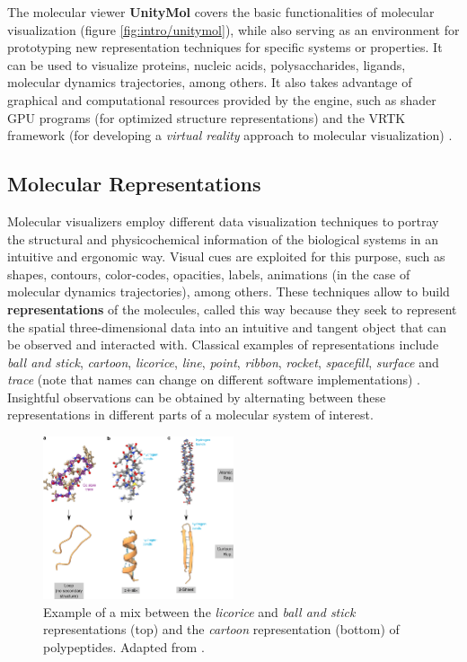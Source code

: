     The molecular viewer \textbf{UnityMol} covers the basic functionalities of molecular visualization (figure \ref{fig:intro/unitymol}), while also serving as an environment for prototyping new representation techniques for specific systems or properties. It can be used to visualize proteins, nucleic acids, polysaccharides, ligands, molecular dynamics trajectories, among others. It also takes advantage of graphical and computational resources provided by the engine, such as shader GPU programs (for optimized structure representations) and the VRTK framework (for developing a \textit{virtual reality} approach to molecular visualization) \cite{unitymol_2015, unitymol_web}.

  \subsection{Molecular Representations}
    Molecular visualizers employ different data visualization techniques to portray the structural and physicochemical information of the biological systems in an intuitive and ergonomic way. Visual cues are exploited for this purpose, such as shapes, contours, color-codes, opacities, labels, animations (in the case of molecular dynamics trajectories), among others. These techniques allow to build \textbf{representations} of the molecules, called this way because they seek to represent the spatial three-dimensional data into an intuitive and tangent object that can be observed and interacted with. Classical examples of representations include \textit{ball and stick}, \textit{cartoon}, \textit{licorice}, \textit{line}, \textit{point}, \textit{ribbon}, \textit{rocket}, \textit{spacefill}, \textit{surface} and \textit{trace} (note that names can change on different software implementations) \cite{representations_web}. Insightful observations can be obtained by alternating between these representations in different parts of a molecular system of interest.

    \begin{figure}[H]
      \centering
      \includegraphics[width=0.5\textwidth]{figures/intro/rep_cartoon.png}
      \caption{\label{fig:intro/rep_cartoon} Example of a mix between the \textit{licorice} and \textit{ball and stick} representations (top) and the \textit{cartoon} representation (bottom) of polypeptides. Adapted from \cite{representations_2021}.}
    \end{figure}

